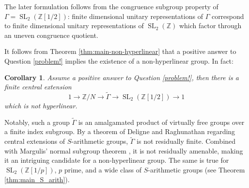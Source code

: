 \documentclass[11pt]{amsart}
\DeclareMathOperator{\SL}{SL}
\newcommand{\R}{{\mathbb{R}}}
\newcommand{\Q}{{\mathbb{Q}}}
\newcommand{\Z}{{\mathbb{Z}}}
\newtheorem{corollary}[theorem]{Corollary}
\theoremstyle{definition}
\theoremstyle{remark}
\newtheorem{remark}[theorem]{Remark}
\theoremstyle{definition}
\begin{document}
The later formulation follows from the congruence subgroup property of $\Gamma = \SL_2(\Z[1/2])$: finite dimensional unitary representations of $\Gamma$ correspond to finite dimensional unitary representations of $\SL_2(\Z)$ which factor through an uneven congruence quotient.

It follows from Theorem \ref{thm:main-non-hyperlinear} that a positive answer to Question \ref{problem!} implies the existence of a non-hyperlinear group.
In fact:


\begin{corollary}\label{cor:SL_2}
    Assume a positive answer to Question \ref{problem!}, then there is a finite central extension
    \[
1\longrightarrow \Z/N\longrightarrow\widetilde\Gamma\longrightarrow \SL_2(\Z[1/2])\longrightarrow1
\]
    which is not hyperlinear.
\end{corollary}

Notably, such a group $\tilde \Gamma$ is an amalgamated product of virtually free groups over a finite index subgroup.
By a theorem of Deligne \cite{Deligne} and Raghunathan \cite{Rag_torsion} regarding central extensions of $S$-arithmetic groups, $\widetilde{\Gamma}$ is not residually finite.
Combined with Margulis' normal subgroup theorem \cite{margulis1991discrete}, it is not residually amenable, making it an intriguing candidate for a non-hyperlinear group.
The same is true for $\SL_2(\Z[1/p])$, $p$ prime, and a wide class of $S$-arithmetic groups (see Theorem \ref{thm:main_S_arith}).

\end{document}

